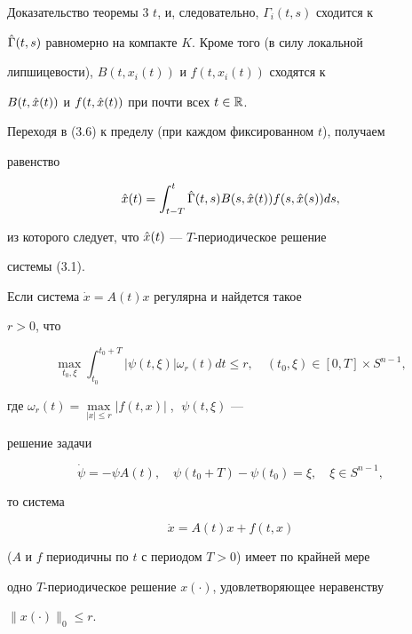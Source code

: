 \begin{pf*}{Доказательство теоремы 3}
$t$, и, следовательно, $\Gamma_i(t,s)$ сходится к


$\Hat \Gamma(t,s)$ равномерно на компакте $K$. Кроме того (в силу локальной


липшицевости), $B(t,x_i(t))$ и $f(t,x_i(t))$ сходятся к


$B(t,\Hat x(t))$ и $f(t,\Hat x(t))$ при почти всех $t\in \Bbb R$.


Переходя в (3.6) к пределу (при каждом фиксированном $t$), получаем


равенство


$$


\Hat x(t)=\int_{t-T}^{t}\Hat\Gamma(t,s)B(s,\Hat x(t))f(s,\Hat x(s))ds,


$$


из которого следует, что $\Hat x(t)$ --- $T$-периодическое решение


системы (3.1).


\end{pf*}





\begin{cor} Если система $\Dot x =A(t)x$ регулярна и найдется такое


$r>0$, что


%


\begin{equation}


\max_{t_0,\xi}\int_{t_0}^{t_0+T}|\psi(t,\xi)|\omega_{r}(t)dt


\le r, \quad (t_0,\xi)\in [0,T]\times S^{n-1},


\end{equation}


%


где $\omega_r(t)=\max\limits_{|x|\le r}|f(t,x)|\;$, $\;\psi (t,\xi)$ ---


решение задачи


$$


\Dot\psi = -\psi A(t),\quad \psi(t_0 + T) - \psi(t_0) =


\xi,\quad \xi \in S^{n-1},


$$


то система


%


\begin{equation}


\Dot x = A(t)x + f(t,x)


\end{equation}


%


($A$ и $f$ периодичны по $t$ с периодом $ T > 0$) имеет по крайней мере


одно $T$-периодическое решение $x(\cdot)$, удовлетворяющее неравенству


$\|x(\cdot)\|_0\le r$.


\end{cor}





